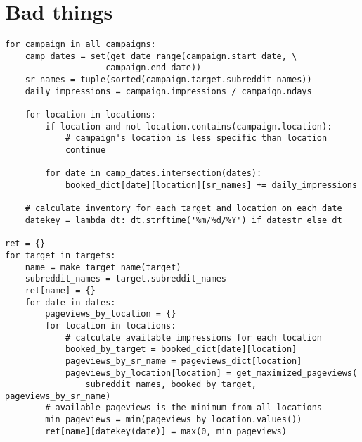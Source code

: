 \documentclass[11pt, a4paper]{article}
\begin{document}
\section{Bad things}

\hrulefill
\begin{lstlisting}[caption=3 nested for-loops - 2 times in a row - in a single function]
for campaign in all_campaigns:
    camp_dates = set(get_date_range(campaign.start_date, \
					campaign.end_date))
    sr_names = tuple(sorted(campaign.target.subreddit_names))
    daily_impressions = campaign.impressions / campaign.ndays

    for location in locations:
        if location and not location.contains(campaign.location):
            # campaign's location is less specific than location
            continue

        for date in camp_dates.intersection(dates):
            booked_dict[date][location][sr_names] += daily_impressions

    # calculate inventory for each target and location on each date
    datekey = lambda dt: dt.strftime('%m/%d/%Y') if datestr else dt

ret = {}
for target in targets:
    name = make_target_name(target)
    subreddit_names = target.subreddit_names
    ret[name] = {}
    for date in dates:
        pageviews_by_location = {}
        for location in locations:
            # calculate available impressions for each location
            booked_by_target = booked_dict[date][location]
            pageviews_by_sr_name = pageviews_dict[location]
            pageviews_by_location[location] = get_maximized_pageviews(
                subreddit_names, booked_by_target, pageviews_by_sr_name)
        # available pageviews is the minimum from all locations
        min_pageviews = min(pageviews_by_location.values())
        ret[name][datekey(date)] = max(0, min_pageviews)
\end{lstlisting}
\hrulefill
\end{document}
